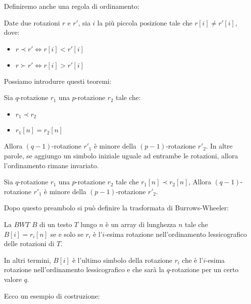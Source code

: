 Definiremo anche una regola di ordinamento:
\begin{definizione}
    Date due rotazioni $r$ e $r'$, sia $i$ la più piccola posizione tale che
    $r[i]\ne r'[i]$, dove:
    \begin{itemize}
        \item $r \prec r'\iff r[i] < r'[i]$
        \item $r \succ r'\iff r[i] > r'[i]$
    \end{itemize}
\end{definizione}
Possiamo introdurre questi teoremi:
\begin{teorema}
    \label{th:ord-rot-1}
    Sia $q$-rotazione $r_1$ una $p$-rotazione $r_2$ tale che:
    \begin{itemize}
        \item $r_1 \prec r_2$
        \item $r_1[n] = r_2[n]$
    \end{itemize}
    Allora $(q - 1)$-rotazione $r'_1$ è minore della $(p - 1)$-rotazione $r'_2$.
    In altre parole, se aggiungo un simbolo iniziale uguale ad entrambe le
    rotazioni, allora l'ordinamento rimane invariato.
\end{teorema}
\begin{teorema}
    \label{th:ord-rot-2}
    Sia $q$-rotazione $r_1$ una $p$-rotazione $r_2$ tale che $r_1[n] \prec r_2[n]$,
    Allora $(q - 1)$-rotazione $r'_1$ è minore della $(p - 1)$-rotazione $r'_2$.
\end{teorema}
Dopo questo preambolo si può definire la trasformata di Burrows-Wheeler:
\begin{definizione}
    La $BWT$ $B$ di un testo $T$ lungo $n$ è un array di lunghezza $n$ tale che
    $B[i] = r_i[n]$ se e solo se $r_i$ è l'$i$-esima rotazione nell'ordinamento
    lessicografico delle rotazioni di $T$.

    In altri termini, $B[i]$ è l'ultimo simbolo della rotazione $r_i$ che è
    l'$i$-esima rotazione nell'ordinamento lessicografico e che sarà la
    $q$-rotazione per un certo valore $q$.
\end{definizione}
Ecco un esempio di costruzione:
